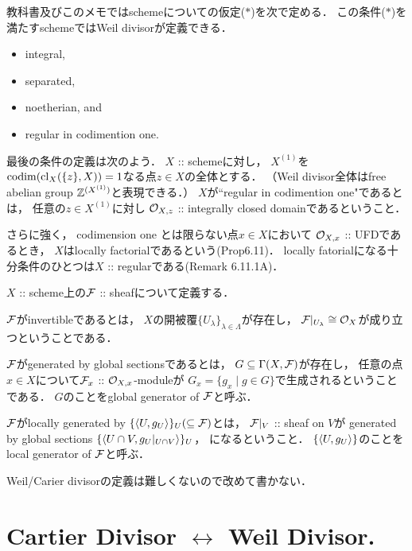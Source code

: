 \documentclass[a4paper]{jsarticle}
\begin{document}
\begin{Def}
    教科書及びこのメモではschemeについての仮定($*$)を次で定める．
    この条件($*$)を満たすschemeではWeil divisorが定義できる．
    \begin{itemize}
        \item integral,
        \item separated,
        \item noetherian, and
        \item regular in codimention one.
    \end{itemize}

    最後の条件の定義は次のよう．
    $X$ :: schemeに対し，
    $X^{(1)}$を$\operatorname{codim}(\operatorname{cl}_X(\{z\},X))=1$なる点$z \in X$の全体とする．
    （Weil divisor全体はfree abelian group $\mathbb{Z}^{(X^{(1)})}$と表現できる．）
    $X$が``regular in codimention one"であるとは，
    任意の$z \in X^{(1)}$に対し
    $\mathcal{O}_{X,z}$ :: integrally closed domainであるということ．

    さらに強く，
    codimension one とは限らない点$x \in X$において
    $\mathcal{O}_{X,x}$ :: UFDであるとき，
    $X$はlocally factorialであるという(Prop6.11)．
    locally fatorialになる十分条件のひとつは$X$ :: regularである(Remark 6.11.1A)．
\end{Def}

\begin{Def}
    $X$ :: scheme上の$\mathcal{F}$ :: sheafについて定義する．
    
    $\mathcal{F}$がinvertibleであるとは，
    $X$の開被覆$\{ U_{\lambda} \}_{\lambda \in \Lambda}$が存在し，
    $\mathcal{F}|_{U_{\lambda}} \cong \mathcal{O}_X$が成り立つということである．

    $\mathcal{F}$がgenerated by global sectionsであるとは，
    $G \subseteq \Gamma(X,\mathcal{F})$が存在し，
    任意の点$x \in X$について$\mathcal{F}_x$ :: $\mathcal{O}_{X,x}$-moduleが
    $G_x=\{ g_x \mid g \in G \}$で生成されるということである．
    $G$のことをglobal generator of $\mathcal{F}$と呼ぶ．

    $\mathcal{F}$がlocally generated by $\{\langle U,g_U \rangle\}_U (\subseteq \mathcal{F})$とは，
    $\mathcal{F}|_V$ :: sheaf on $V$が
    generated by global sections $\{\langle U \cap V,g_U|_{U \cap V} \rangle\}_U$，
    になるということ．
    $\{\langle U,g_U \rangle\}$のことをlocal generator of $\mathcal{F}$と呼ぶ．
\end{Def}

    Weil/Carier divisorの定義は難しくないので改めて書かない．


\section{Cartier Divisor $\leftrightarrow$ Weil Divisor.}
\end{document}

